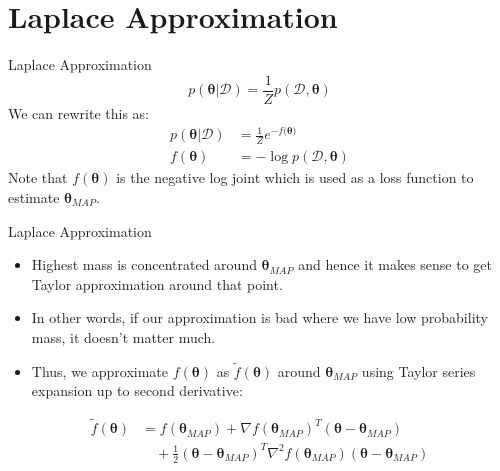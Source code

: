 \documentclass{beamer}
\begin{document}
\section{Laplace Approximation}

\begin{frame}{Laplace Approximation}
    \begin{equation*}
        p(\boldsymbol{\theta}| \mathcal{D}) = \frac{1}{Z}p(\mathcal{D}, \boldsymbol{\theta})
    \end{equation*}
    \pause
    We can rewrite this as:
    \begin{align*}
        p(\boldsymbol{\theta}| \mathcal{D}) & = \frac{1}{Z}e^{-f(\boldsymbol{\theta)}}    \\
        f(\boldsymbol{\theta})              & = -\log p(\mathcal{D}, \boldsymbol{\theta})
    \end{align*}
    \pause
    Note that $f(\boldsymbol{\theta})$ is the negative log joint which is used as a loss function to estimate $\boldsymbol{\theta}_{MAP}$.
\end{frame}

\begin{frame}{Laplace Approximation}
    \begin{itemize}
        \item Highest mass is concentrated around $\boldsymbol{\theta}_{MAP}$ and hence it makes sense to get Taylor approximation around that point.
              \pause
        \item In other words, if our approximation is bad where we have low probability mass, it doesn't matter much.
              \pause
        \item Thus, we approximate $f(\boldsymbol{\theta})$ as $\tilde{f}(\boldsymbol{\theta})$ around $\boldsymbol{\theta}_{MAP}$ using Taylor series expansion up to second derivative:
    \end{itemize}
    \begin{align*}
        \tilde{f}(\boldsymbol{\theta}) & = f(\boldsymbol{\theta}_{MAP}) + \nabla f(\boldsymbol{\theta}_{MAP})^T(\boldsymbol{\theta}-\boldsymbol{\theta}_{MAP})                                     \\
                                       & \quad + \frac{1}{2}(\boldsymbol{\theta}-\boldsymbol{\theta}_{MAP})^T \nabla^2 f(\boldsymbol{\theta}_{MAP})(\boldsymbol{\theta}-\boldsymbol{\theta}_{MAP})
    \end{align*}
\end{frame}
\end{document}

